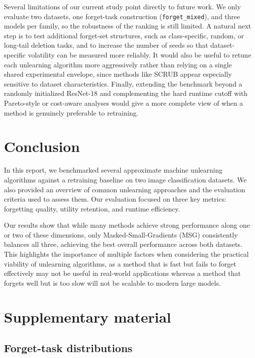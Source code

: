 \documentclass{article}
\begin{document}
Several limitations of our current study point directly to future work. We only evaluate two datasets, one forget-task construction (\texttt{forget\_mixed}), and three models per family, so the robustness of the ranking is still limited. A natural next step is to test additional forget-set structures, such as class-specific, random, or long-tail deletion tasks, and to increase the number of seeds so that dataset-specific volatility can be measured more reliably. It would also be useful to retune each unlearning algorithm more aggressively rather than relying on a single shared experimental envelope, since methods like SCRUB appear especially sensitive to dataset characteristics. Finally, extending the benchmark beyond a randomly initialized ResNet-18 and complementing the hard runtime cutoff with Pareto-style or cost-aware analyses would give a more complete view of when a method is genuinely preferable to retraining.

\section{Conclusion}
In this report, we benchmarked several approximate machine unlearning algorithms against a retraining baseline on two image classification datasets. We also provided an overview of common unlearning approaches and the evaluation criteria used to assess them. Our evaluation focused on three key metrics: forgetting quality, utility retention, and runtime efficiency.

Our results show that while many methods achieve strong performance along one or two of these dimensions, only Masked-Small-Gradients (MSG) consistently balances all three, achieving the best overall performance across both datasets. This highlights the importance of multiple factors when considering the practical viability of unlearning algorithms, as a method that is fast but fails to forget effectively may not be useful in real-world applications whereas a method that forgets well but is too slow will not be scalable to modern large models.

\printbibliography


\newpage
\appendix

\section{Supplementary material} \label{app:info}
\subsection{Forget-task distributions}
\end{document}
